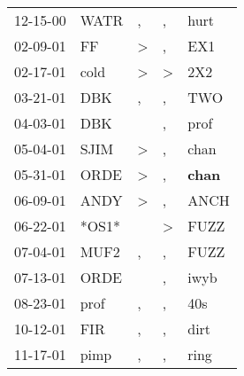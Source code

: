\begin{supertabular}{p{0.07\textwidth}p{0.06\textwidth}p{0.02\textwidth}p{0.02\textwidth}p{0.06\textwidth}}
          12-15-00\textsuperscript{} &           WATR\textsuperscript{} &                , &                , &           hurt\textsuperscript{} \\
          02-09-01\textsuperscript{} &             FF\textsuperscript{} &     \textgreater &                , &            EX1\textsuperscript{} \\
          02-17-01\textsuperscript{} &           cold\textsuperscript{} &     \textgreater &     \textgreater &            2X2\textsuperscript{} \\
          03-21-01\textsuperscript{} &            DBK\textsuperscript{} &                , &                , &            TWO\textsuperscript{} \\
          04-03-01\textsuperscript{} &            DBK\textsuperscript{} &                  &                , &           prof\textsuperscript{} \\
          05-04-01\textsuperscript{} &           SJIM\textsuperscript{} &     \textgreater &                , &           chan\textsuperscript{} \\
          05-31-01\textsuperscript{} &           ORDE\textsuperscript{} &     \textgreater &                , &  \textbf{chan\textsuperscript{}} \\
          06-09-01\textsuperscript{} &           ANDY\textsuperscript{} &     \textgreater &                , &           ANCH\textsuperscript{} \\
          06-22-01\textsuperscript{} &                            *OS1* &                  &     \textgreater &           FUZZ\textsuperscript{} \\
          07-04-01\textsuperscript{} &           MUF2\textsuperscript{} &                , &                , &           FUZZ\textsuperscript{} \\
          07-13-01\textsuperscript{} &           ORDE\textsuperscript{} &                  &                , &           iwyb\textsuperscript{} \\
          08-23-01\textsuperscript{} &           prof\textsuperscript{} &                , &                , &            40s\textsuperscript{} \\
          10-12-01\textsuperscript{} &            FIR\textsuperscript{} &                , &                , &           dirt\textsuperscript{} \\
          11-17-01\textsuperscript{} &           pimp\textsuperscript{} &                , &                , &           ring\textsuperscript{} \\

\end{supertabular}
